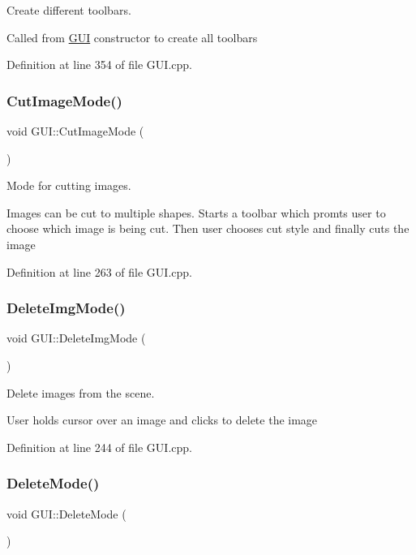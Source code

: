 Create different toolbars. 

Called from \mbox{\hyperlink{classGUI}{G\+UI}} constructor to create all toolbars 

Definition at line 354 of file G\+U\+I.\+cpp.

\mbox{\label{classGUI_ae8acfcce2ea4da241c920076b72f1c93}} 
\subsubsection{\texorpdfstring{Cut\+Image\+Mode()}{CutImageMode()}}
{\footnotesize\ttfamily void G\+U\+I\+::\+Cut\+Image\+Mode (\begin{DoxyParamCaption}{ }\end{DoxyParamCaption})}



Mode for cutting images. 

Images can be cut to multiple shapes. Starts a toolbar which promts user to choose which image is being cut. Then user chooses cut style and finally cuts the image 

Definition at line 263 of file G\+U\+I.\+cpp.

\mbox{\label{classGUI_a453b758a292b4a0e6f52f25b1bb2de77}} 
\subsubsection{\texorpdfstring{Delete\+Img\+Mode()}{DeleteImgMode()}}
{\footnotesize\ttfamily void G\+U\+I\+::\+Delete\+Img\+Mode (\begin{DoxyParamCaption}{ }\end{DoxyParamCaption})}



Delete images from the scene. 

User holds cursor over an image and clicks to delete the image 

Definition at line 244 of file G\+U\+I.\+cpp.

\mbox{\label{classGUI_aac66154aaa763aac4d20e55cbd1bdc0d}} 
\subsubsection{\texorpdfstring{Delete\+Mode()}{DeleteMode()}}
{\footnotesize\ttfamily void G\+U\+I\+::\+Delete\+Mode (\begin{DoxyParamCaption}{ }\end{DoxyParamCaption})}



